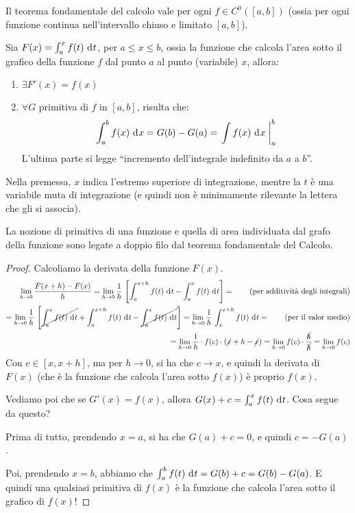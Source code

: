 Il teorema fondamentale del calcolo vale per ogni $f \in C^{0} ([a,b])$ (ossia per ogni funzione continua nell'intervallo chiuso e limitato $[a,b]$).

\begin{theorem}
Sia $F(x) = \int_{a}^{x} f(t) \dx[t]$, per $a \le x \le b$, ossia la funzione che calcola l'area sotto il grafico della funzione $f$ dal punto $a$ al punto (variabile) $x$, allora:
\begin{enumerate}
    \item $\exists F'(x) = f(x)$
    \item $\forall G$ primitiva di $f$ in $[a,b]$, risulta che:
    \[
    \int_{a}^{b} f(x) \dx = G(b) - G(a) = \increment{\int f(x) \dx}_{a}^{b}
    \]
    L'ultima parte si legge ``incremento dell'integrale indefinito da $a$ a $b$''.
\end{enumerate}
\end{theorem}
Nella premessa, $x$ indica l'estremo superiore di integrazione, mentre la $t$ \`e una variabile muta di integrazione (e quindi non \`e minimamente rilevante la lettera che gli si associa).

La nozione di primitiva di una funzione e quella di area individuata dal grafo della funzione sono legate a doppio filo dal teorema fondamentale del Calcolo.

\begin{proof}
Calcoliamo la derivata della funzione $F(x)$.
\begin{align*}
\lim_{h \to 0} \frac{F(x + h) - F(x)}{h} = 
\lim_{h \to 0} \frac{1}{h} \, \left[ \int_{a}^{x+h} f(t) \dx[t] - \int_{a}^{x} f(t) \dx[t] \right] = \tag{per additivit\`a degli integrali} \\
= \lim_{h \to 0} \frac{1}{h} \, \left[ \cancel{\int_{a}^{x} f(t) \dx[t]} + \int_{x}^{x+h} f(t) \dx[t] - \cancel{\int_{a}^{x} f(t) \dx[t]} \right]
= \lim_{h \to 0} \frac{1}{h} \, \int_{x}^{x+h} f(t) \dx[t] = \tag{per il valor medio} \\
= \lim_{h \to 0} \frac{1}{h} \cdot f(c) \cdot (\cancel{x} + h - \cancel{x}) = \lim_{h \to 0} f(c) \cdot \frac{\cancel{h}}{\cancel{h}} = \lim_{h \to 0} f(c)
\end{align*}
Con $c \in [x, x+h]$, ma per $h \to 0$, si ha che $c \to x$, e quindi la derivata di $F(x)$ (che \`e la funzione che calcola l'area sotto $f(x)$) \`e proprio $f(x)$. 

Vediamo poi che se $G'(x) = f(x)$, allora $G(x) + c = \int_{a}^{x} f(t) \dx[t]$. Cosa segue da questo?

Prima di tutto, prendendo $x = a$, si ha che $G(a) + c = 0$, e quindi $c = - G(a)$.

Poi, prendendo $x = b$, abbiamo che $\int_{a}^{b} f(t) \dx[t] = G(b) + c = G(b) - G(a)$. E quindi una qualsiasi primitiva di $f(x)$ \`e la funzione che calcola l'area sotto il grafico di $f(x)$!
\end{proof}

